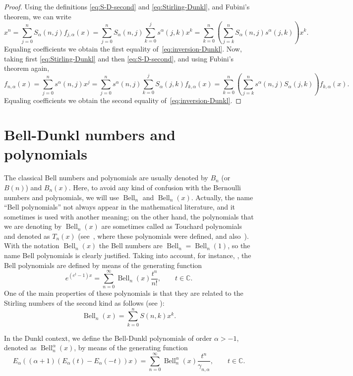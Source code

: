 \documentclass[11pt,a4paper]{article}
\theoremstyle{plain}
\theoremstyle{remark}
\newcommand{\Ea}{E_{\alpha}}
\newcommand{\Bell}{\operatorname{Bell}}
\newcommand{\CC}{\mathbb{C}}
\newcommand{\cc}{\gamma}
\begin{document}
\begin{proof}
Using the definitions \eqref{eq:S-D-second} and \eqref{eq:Stirling-Dunkl}, and Fubini's theorem, we can write
\[
  x^n = \sum_{j=0}^n S_{\alpha}(n,j)f_{j,\alpha}(x)
  = \sum_{j=0}^n S_{\alpha}(n,j) \sum_{k=0}^js^{\alpha}(j,k)x^k
  = \sum_{k=0}^n \left(\sum_{j=k}^n S_{\alpha}(n,j) s^{\alpha}(j,k)\right) x^k.
\]
Equaling coefficients we obtain the first equality of~\eqref{eq:inversion-Dunkl}. Now, taking first \eqref{eq:Stirling-Dunkl} and then \eqref{eq:S-D-second}, and using Fubini's theorem again,
\[
  f_{n,\alpha}(x) = \sum_{j=0}^n s^{\alpha}(n,j)x^j
  = \sum_{j=0}^n s^{\alpha}(n,j) \sum_{k=0}^j S_{\alpha}(j,k)f_{k,\alpha}(x)
  = \sum_{k=0}^n \left(\sum_{j=k}^n s^{\alpha}(n,j) S_{\alpha}(j,k)\right) f_{k,\alpha}(x).
\]
Equaling coefficients we obtain the second equality of~\eqref{eq:inversion-Dunkl}.
\end{proof}

\section{Bell-Dunkl numbers and polynomials}
\label{sec:Bell}

The classical Bell numbers and polynomials are usually denoted by $B_n$ (or $B(n)$) and $B_n(x)$. Here, to avoid any kind of confusion with the Bernoulli numbers and polynomials, we will use $\Bell_n$ and $\Bell_n(x)$. Actually, the name ``Bell polynomials'' not always appear in the mathematical literature, and it sometimes is used with another meaning; on the other hand, the polynomials that we are denoting by $\Bell_n(x)$ are sometimes called as Touchard polynomials and denoted as $T_n(x)$ (see~\cite{Tou}, where these polynomials were defined, and also~\cite[\S\,4.6]{NRV}). With the notation $\Bell_n(x)$ the Bell numbers are $\Bell_n = \Bell_n(1)$, so the name Bell polynomials is clearly justified. Taking into account, for instance, \cite[26.7.5 and 26.8.13]{Br-NIST}, the Bell polynomials are defined by means of the generating function
\[
  e^{(e^t-1)x} = \sum_{n=0}^{\infty} \Bell_n(x) \frac{t^n}{n!},
  \qquad t\in\CC.
\]
One of the main properties of these polynomials is that they are related to the Stirling numbers of the second kind as follows (see \cite[26.7.2]{Br-NIST}): 
\[
  \Bell_n(x) = \sum_{k=0}^n S(n,k) x^k.
\]

In the Dunkl context, we define the Bell-Dunkl polynomials of order $\alpha>-1$, denoted as $\Bell_n^\alpha(x)$, by means of the generating function
\begin{equation}
\label{eq:defBell}
  \Ea((\alpha+1)(\Ea(t)-\Ea(-t))x) = \sum_{n=0}^{\infty} \Bell_n^\alpha(x) \frac{t^n}{\cc_{n,\alpha}},
  \qquad t\in\CC.
\end{equation}
\end{document}
